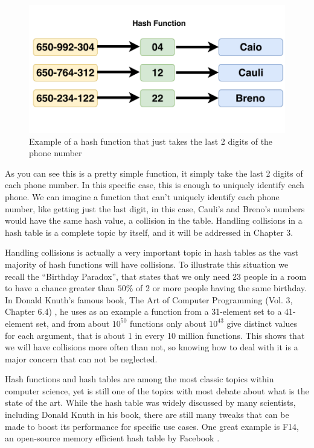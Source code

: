 \bigskip

\begin{figure}[h!]
  \centering
  \includegraphics[width=12cm]{figuras/phone-hash-example.pdf}
  \caption{Example of a hash function that just takes the last 2 digits of the phone number }
\end{figure}

\medskip

As you can see this is a pretty simple function, it simply take the last 2 digits of each phone number. In this specific case, this is enough to uniquely identify each phone. We can imagine a function that can't uniquely identify each phone number, like getting just the last digit, in this case, Cauli's and Breno's numbers would have the same hash value, a collision in the table. Handling collisions in a hash table is a complete topic by itself, and it will be addressed in Chapter 3. 

Handling collisions is actually a very important topic in hash tables as the vast majority of hash functions will have collisions. To illustrate this situation we recall the ``Birthday Paradox'', that states that we only need 23 people in a room to have a chance greater than \( 50\% \) of 2 or more people having the same birthday. In Donald Knuth's famous book, The Art of Computer Programming (Vol. 3, Chapter 6.4) \citep{TAOCP3}, he uses as an example a function from a 31-element set to a 41-element set, and from about \( 10^{50} \) functions only about \( 10^{43} \) give distinct values for each argument, that is about 1 in every 10 million functions. This shows that we will have collisions more often than not, so knowing how to deal with it is a major concern that can not be neglected.

Hash functions and hash tables are among the most classic topics within computer science, yet is still one of the topics with most debate about what is the state of the art. While the hash table was widely discussed by many scientists, including Donald Knuth in his book, there are still many tweaks that can be made to boost its performance for specific use cases. One great example is F14, an open-source memory efficient hash table by Facebook \citep{F14}.

